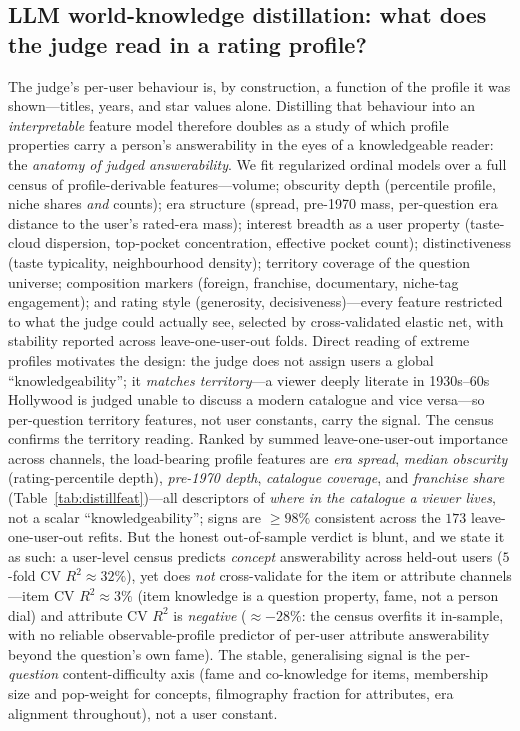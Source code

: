 \documentclass[11pt]{article}
\begin{document}
\subsection{LLM world-knowledge distillation: what does the judge read in a rating profile?}\label{sec:distill}
The judge's per-user behaviour is, by construction, a function of the profile it was shown---titles, years, and
star values alone. Distilling that behaviour into an \emph{interpretable} feature model therefore doubles as a
study of which profile properties carry a person's answerability in the eyes of a knowledgeable reader: the
\emph{anatomy of judged answerability}. We fit regularized ordinal models over a full census of
profile-derivable features---volume; obscurity depth (percentile profile, niche shares \emph{and} counts);
era structure (spread, pre-1970 mass, per-question era distance to the user's rated-era mass); interest
breadth as a user property (taste-cloud dispersion, top-pocket concentration, effective pocket count);
distinctiveness (taste typicality, neighbourhood density); territory coverage of the question universe;
composition markers (foreign, franchise, documentary, niche-tag engagement); and rating style
(generosity, decisiveness)---every feature restricted to what the judge could actually see, selected by
cross-validated elastic net, with stability reported across leave-one-user-out folds. Direct reading of
extreme profiles motivates the design: the judge does not assign users a global ``knowledgeability'';
it \emph{matches territory}---a viewer deeply literate in 1930s--60s Hollywood is judged unable to discuss a
modern catalogue and vice versa---so per-question territory features, not user constants, carry the signal.
The census confirms the territory reading. Ranked by summed leave-one-user-out importance across channels, the
load-bearing profile features are \emph{era spread}, \emph{median obscurity} (rating-percentile depth),
\emph{pre-1970 depth}, \emph{catalogue coverage}, and \emph{franchise share} (Table~\ref{tab:distillfeat})---all
descriptors of \emph{where in the catalogue a viewer lives}, not a scalar ``knowledgeability''; signs are $\ge98\%$
consistent across the $173$ leave-one-user-out refits. But the honest out-of-sample verdict is blunt, and we state
it as such: a user-level census predicts \emph{concept} answerability across held-out users ($5$-fold CV
$R^2\approx32\%$), yet does \emph{not} cross-validate for the item or attribute channels---item CV $R^2\approx3\%$
(item knowledge is a question property, fame, not a person dial) and attribute CV $R^2$ is \emph{negative}
($\approx-28\%$: the census overfits it in-sample, with no reliable observable-profile predictor of per-user attribute
answerability beyond the question's own fame). The stable, generalising signal is the per-\emph{question}
content-difficulty axis (fame and co-knowledge for items, membership size and pop-weight for concepts, filmography
fraction for attributes, era alignment throughout), not a user constant.
\end{document}

